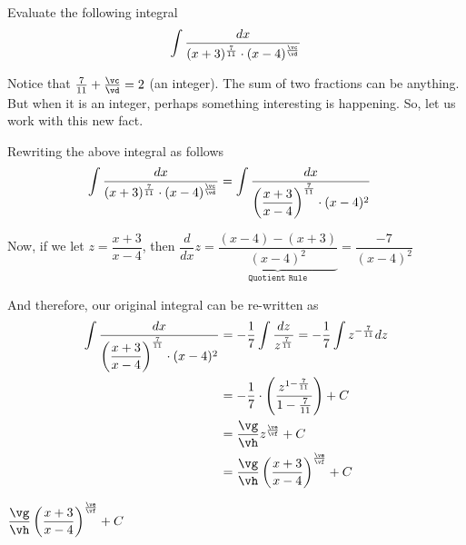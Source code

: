 



\va\vb\vc\vd
{}\va\vb\ve\vf
{}\ve\vf\vg\vh

\question[5] Evaluate the following integral 
    \[ \int\dfrac{dx}{(x+3)^{\frac\va\vb}\cdot (x-4)^{\frac\vc\vd}}\]


\watchout

\begin{solution}[\fullpage]
  Notice that $\frac\va\vb + \frac\vc\vd = 2$ (an integer). The sum of two fractions can be anything. 
  But when it is an integer, perhaps something interesting is happening. So, let us work with this new fact. 

  Rewriting the above integral as follows
  \begin{align}
    \int\dfrac{dx}{(x+3)^{\frac\va\vb}\cdot (x-4)^{\frac\vc\vd}} &= 
    \int\dfrac{dx}{\left( \dfrac{x+3}{x-4} \right)^{\frac\va\vb}\cdot (x-4)^2}
  \end{align}

  Now, if we let $z=\dfrac{x+3}{x-4}$, then 
  $\dfrac{d}{dx} z = \underbrace{\dfrac{(x-4)-(x+3)}{(x-4)^2}}_{\texttt{Quotient Rule}} = \dfrac{-7}{(x-4)^2}$

  And therefore, our original integral can be re-written as 
  \begin{align}
    \int\dfrac{dx}{\left( \dfrac{x+3}{x-4} \right)^{\frac\va\vb}\cdot (x-4)^2} &= 
    -\dfrac{1}{7}\int\dfrac{dz}{z^{\frac\va\vb}} = -\dfrac{1}{7}\int z^{-\frac\va\vb} dz \\
    &= -\dfrac{1}{7}\cdot\left( \dfrac{z^{1-\frac\va\vb}}{1-\frac\va\vb}\right) + C \\
    &= \dfrac\vg\vh z^\frac\ve\vf + C  \\
    &= \dfrac\vg\vh\left( \dfrac{x+3}{x-4} \right)^\frac\ve\vf + C 
  \end{align}
\end{solution}

\ifprintanswers
  \begin{codex}
    $\dfrac\vg\vh\left( \dfrac{x+3}{x-4} \right)^\frac\ve\vf + C$
  \end{codex}
\fi
